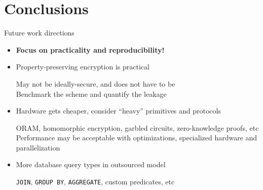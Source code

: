 \section{Conclusions}

	\begin{frame}{Future work directions}

		\begin{itemize}
			\item<1->
				\textbf{Focus on practicality and reproducibility!}

			\item<2->
				Property-preserving encryption is practical \cite{ore-benchmark-17} \\
				\begin{small}
					\indent{} May not be ideally-secure, and does not have to be \\
					\indent{} Benchmark the scheme and quantify the leakage
				\end{small}

			\item<3->
				Hardware gets cheaper, consider ``heavy'' primitives and protocols \cite{epsolute} \\
				\begin{small}
					\indent{} ORAM, homomorphic encryption, garbled circuits, zero-knowledge proofs, etc \\
					\indent{} Performance may be acceptable with optimizations, specialized hardware and parallelization
				\end{small}

			\item<4->
				More database query types in outsourced model \\
				\begin{small}
					\indent{} \texttt{JOIN}, \texttt{GROUP BY}, \texttt{AGGREGATE}, custom predicates, etc
				\end{small}

		\end{itemize}

	\end{frame}
